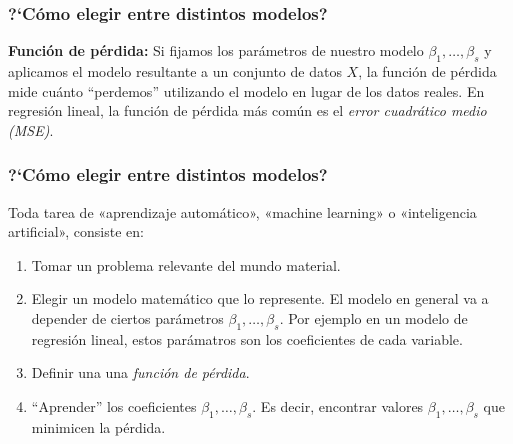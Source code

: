 \documentclass[aspectratio=169,12pt]{beamer}
\begin{document}

\begin{frame}
\frametitle{?`C\'omo elegir entre distintos modelos?}

\textbf{Función de pérdida:} Si fijamos los parámetros de nuestro modelo $\beta_1, \dots, \beta_s$ y aplicamos el modelo resultante a un conjunto de datos $X$, la función de pérdida mide cuánto ``perdemos'' utilizando el modelo en lugar de los datos reales.
En regresión lineal, la función de pérdida más común es el \emph{error cuadrático medio (MSE)}.

\end{frame}



\begin{frame}
\frametitle{?`C\'omo elegir entre distintos modelos?}

Toda tarea de «aprendizaje automático», «machine learning» o «inteligencia artificial»,
consiste en:
\begin{enumerate}
\item Tomar un problema relevante del mundo material.
\item Elegir un modelo matemático que lo represente. El modelo en general va a depender de ciertos parámetros $\beta_1, \dots, \beta_s$.
Por ejemplo en un modelo de regresión lineal, estos parámatros son los coeficientes de cada variable.
\item Definir una una \emph{función de pérdida}.
\item ``Aprender'' los coeficientes $\beta_1, \dots, \beta_s$. Es decir, encontrar valores $\beta_1, \dots, \beta_s$ que minimicen la pérdida.
\end{enumerate}
\end{frame}

\end{document}
